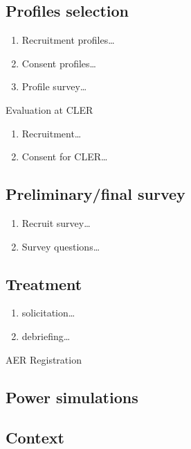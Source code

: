 \documentclass[12pt, titlepage]{article}
\providecommand{\tightlist}{%
  \setlength{\itemsep}{0pt}\setlength{\parskip}{0pt}}
\begin{document}
\subsection{Profiles selection}\label{profiles-selection}

\begin{enumerate}
\def\labelenumi{\arabic{enumi}.}
\tightlist
\item
  Recruitment profiles\ldots{}
\item
  Consent profiles\ldots{}
\item
  Profile survey\ldots{}
\end{enumerate}

Evaluation at CLER

\begin{enumerate}
\def\labelenumi{\arabic{enumi}.}
\tightlist
\item
  Recruitment\ldots{}
\item
  Consent for CLER\ldots{}
\end{enumerate}

\subsection{Preliminary/final survey}\label{preliminaryfinal-survey}

\begin{enumerate}
\def\labelenumi{\arabic{enumi}.}
\tightlist
\item
  Recruit survey\ldots{}
\item
  Survey questions\ldots{}
\end{enumerate}

\subsection{Treatment}\label{treatment}

\begin{enumerate}
\def\labelenumi{\arabic{enumi}.}
\tightlist
\item
  solicitation\ldots{}
\item
  debriefing\ldots{}
\end{enumerate}

AER Registration

\subsection{Power simulations}\label{power-simulations}

\subsection{Context}\label{context}
\end{document}
